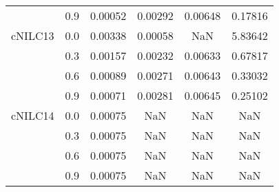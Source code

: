 \begin{longtable}{cccccc}
        & 0.9 & 0.00052 & 0.00292 & 0.00648 & 0.17816 \\
cNILC13 & 0.0 & 0.00338 & 0.00058 & NaN & 5.83642 \\
        & 0.3 & 0.00157 & 0.00232 & 0.00633 & 0.67817 \\
        & 0.6 & 0.00089 & 0.00271 & 0.00643 & 0.33032 \\
        & 0.9 & 0.00071 & 0.00281 & 0.00645 & 0.25102 \\
cNILC14 & 0.0 & 0.00075 & NaN & NaN & NaN \\
        & 0.3 & 0.00075 & NaN & NaN & NaN \\
        & 0.6 & 0.00075 & NaN & NaN & NaN \\
        & 0.9 & 0.00075 & NaN & NaN & NaN \\
\end{longtable}
